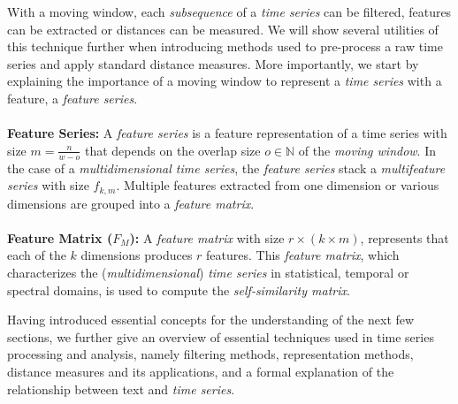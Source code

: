With a moving window, each \textit{subsequence} of a \textit{time series} can be filtered, features can be extracted or distances can be measured. We will show several utilities of this technique further when introducing methods used to pre-process a raw time series and apply standard distance measures. More importantly, we start by explaining the importance of a moving window to represent a \textit{time series} with a feature, a \textit{feature series}.\\\\
\textbf{Feature Series:} A \textit{feature series} is a feature representation of a time series with size $m = \frac{n}{w-o}$ that depends on the overlap size $o \in \mathbb{N}$ of the \textit{moving window}. In the case of a \textit{multidimensional time series}, the \textit{feature series} stack a \textit{multifeature series} with size $f_{k,m}$. Multiple features extracted from one dimension or various dimensions are grouped into a \textit{feature matrix}.\\\\\textbf{Feature Matrix ($F_M$):} A \textit{feature matrix} with size $r \times (k\times m)$, represents that each of the $k$ dimensions produces $r$ features. This \textit{feature matrix}, which characterizes the (\textit{multidimensional}) \textit{time series} in statistical, temporal or spectral domains, is used to compute the \textit{self-similarity matrix}.

Having introduced essential concepts for the understanding of the next few sections, we further give an overview of essential techniques used in time series processing and analysis, namely filtering methods, representation methods, distance measures and its applications, and a formal explanation of the relationship between text and \textit{time series}. 



